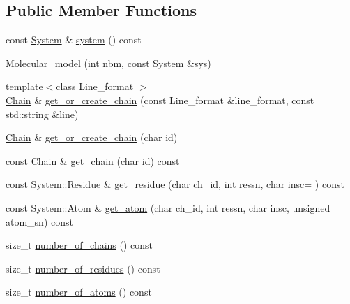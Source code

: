 \subsection*{Public Member Functions}
\begin{DoxyCompactItemize}
\item 
const \hyperlink{classESBTL_1_1Molecular__model_a08cec17302607b3b5f43c94746032996}{System} \& \hyperlink{classESBTL_1_1Molecular__model_a7bb52b062e15f25737625b202b7f2f90}{system} () const
\item 
\hyperlink{classESBTL_1_1Molecular__model_a949676ce128686cc9f3f16e261d1013a}{Molecular\+\_\+model} (int nbm, const \hyperlink{classESBTL_1_1Molecular__model_a08cec17302607b3b5f43c94746032996}{System} \&sys)
\item 
{\footnotesize template$<$class Line\+\_\+format $>$ }\\\hyperlink{classESBTL_1_1Molecular__model_a1d055eb841e64e198a1987e120fc985d}{Chain} \& \hyperlink{classESBTL_1_1Molecular__model_af9f05f174539b4a7e4f284f21c2a310e}{get\+\_\+or\+\_\+create\+\_\+chain} (const Line\+\_\+format \&line\+\_\+format, const std\+::string \&line)
\item 
\hyperlink{classESBTL_1_1Molecular__model_a1d055eb841e64e198a1987e120fc985d}{Chain} \& \hyperlink{classESBTL_1_1Molecular__model_a14cabf8c1154440349fcc2160a258827}{get\+\_\+or\+\_\+create\+\_\+chain} (char id)
\item 
const \hyperlink{classESBTL_1_1Molecular__model_a1d055eb841e64e198a1987e120fc985d}{Chain} \& \hyperlink{classESBTL_1_1Molecular__model_a3ccd03e2055e57d67b315ff990094b82}{get\+\_\+chain} (char id) const
\item 
const System\+::\+Residue \& \hyperlink{classESBTL_1_1Molecular__model_a27690579404665ca7e0de0cb236c7f9b}{get\+\_\+residue} (char ch\+\_\+id, int ressn, char insc=\textquotesingle{} \textquotesingle{}) const
\item 
const System\+::\+Atom \& \hyperlink{classESBTL_1_1Molecular__model_a40c036810c7d02d0b4f6adb65b3c0205}{get\+\_\+atom} (char ch\+\_\+id, int ressn, char insc, unsigned atom\+\_\+sn) const
\item 
size\+\_\+t \hyperlink{classESBTL_1_1Molecular__model_aee31a3089df42d921fd3c2a3be5314c7}{number\+\_\+of\+\_\+chains} () const
\item 
size\+\_\+t \hyperlink{classESBTL_1_1Molecular__model_ab587c75941099a8df3daedd022376ee5}{number\+\_\+of\+\_\+residues} () const
\item 
size\+\_\+t \hyperlink{classESBTL_1_1Molecular__model_add37093d0628999609a736fe19d2779a}{number\+\_\+of\+\_\+atoms} () const

\end{DoxyCompactItemize}
